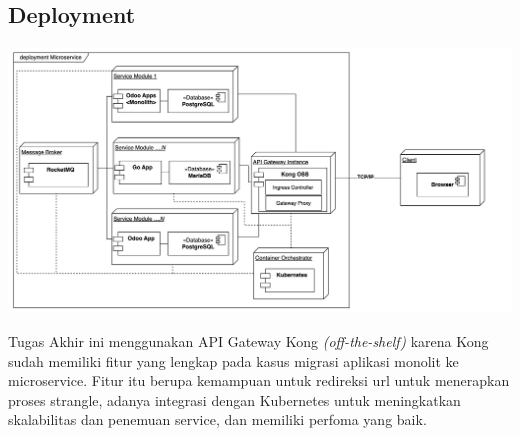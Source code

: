 \subsection{Deployment}
\begin{center}
	\includegraphics[width=14cm]{img/bab_3/Deployment.png}
	\label{fig:asd}
\end{center}
Tugas Akhir ini menggunakan API Gateway Kong \textit{(off-the-shelf)} karena Kong sudah memiliki fitur yang lengkap pada kasus migrasi aplikasi monolit ke microservice. Fitur itu berupa kemampuan untuk redireksi url untuk menerapkan proses strangle, adanya integrasi dengan Kubernetes untuk meningkatkan skalabilitas dan penemuan service, dan memiliki perfoma yang baik.